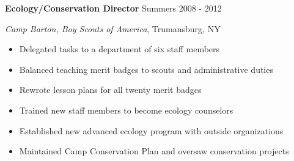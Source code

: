 

\vspace{7pt}

\textbf{Ecology/Conservation Director} \hfill Summers 2008 - 2012

\textit{Camp Barton, Boy Scouts of America}, Trumansburg, NY

\begin{itemize}
    \item Delegated tasks to a department of six staff members
    \item Balanced teaching merit badges to scouts and administrative duties
    \item Rewrote lesson plans for all twenty merit badges
    \item Trained new staff members to become ecology counselors
    \item Established new advanced ecology program with outside organizations
    \item Maintained Camp Conservation Plan and oversaw conservation projects
\end{itemize}
